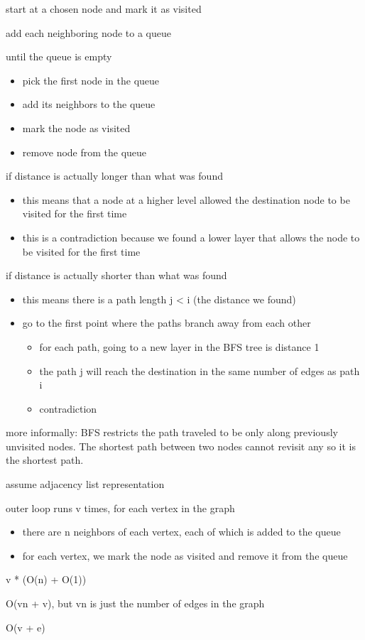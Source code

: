 \algorithm
{
    \item start at a chosen node and mark it as visited
    \item add each neighboring node to a queue 
    \item until the queue is empty
    \begin{itemize}
        \item pick the first node in the queue
        \item add its neighbors to the queue 
        \item mark the node as visited
        \item remove node from the queue
    \end{itemize}
}
{
    \item if distance is actually longer than what was found
    \begin{itemize}
        \item this means that a node at a higher level allowed the destination node to be visited for the first time
        \item this is a contradiction because we found a lower layer that allows the node to be visited for the first time
    \end{itemize}
    \item if distance is actually shorter than what was found
    \begin{itemize}
        \item this means there is a path length j < i (the distance we found)
        \item go to the first point where the paths branch away from each other
        \begin{itemize}
            \item for each path, going to a new layer in the BFS tree is distance 1
            \item the path j will reach the destination in the same number of edges as path i
            \item contradiction
        \end{itemize}
    \end{itemize}
    \item more informally: BFS restricts the path traveled to be only along previously unvisited nodes. The shortest path between two nodes cannot revisit any so it is the shortest path. 
}
{
    \item assume adjacency list representation 
    \item outer loop runs v times, for each vertex in the graph
    \begin{itemize}
        \item there are n neighbors of each vertex, each of which is added to the queue
        \item for each vertex, we mark the node as visited and remove it from the queue
    \end{itemize}
    \item v * (O(n) + O(1))
    \item O(vn + v), but vn is just the number of edges in the graph
    \item O(v + e)
}



